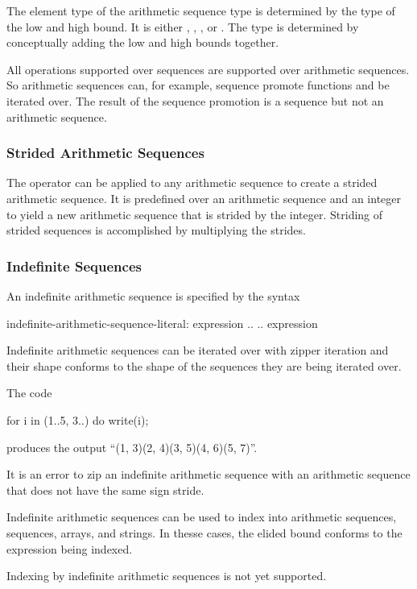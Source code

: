 The element type of the arithmetic sequence type is determined by the
type of the low and high bound.  It is
either , , , or .  The
type is determined by conceptually adding the low and high bounds
together.

All operations supported over sequences are supported over arithmetic
sequences.  So arithmetic sequences can, for example, sequence promote
functions and be iterated over.  The result of the sequence promotion
is a sequence but not an arithmetic sequence.

\subsubsection{Strided Arithmetic Sequences}
\label{Strided_Arithmetic_Sequences}

The  operator can be applied to any arithmetic sequence to
create a strided arithmetic sequence.  It is predefined over an
arithmetic sequence and an integer to yield a new arithmetic sequence
that is strided by the integer.  Striding of strided sequences is
accomplished by multiplying the strides.

\subsubsection{Indefinite Sequences}
\label{Indefinite_Sequences}

An indefinite arithmetic sequence is specified by the syntax
\begin{syntax}
indefinite-arithmetic-sequence-literal:
  expression ..
  .. expression
\end{syntax}

Indefinite arithmetic sequences can be iterated over with zipper
iteration and their shape conforms to the shape of the sequences they
are being iterated over.
\begin{example}
The code
\begin{chapel}
for i in (1..5, 3..) do
  write(i);
\end{chapel}
produces the output ``(1, 3)(2, 4)(3, 5)(4, 6)(5, 7)''.
\end{example}

It is an error to zip an indefinite arithmetic sequence with an
arithmetic sequence that does not have the same sign stride.

Indefinite arithmetic sequences can be used to index into arithmetic
sequences, sequences, arrays, and strings.  In thesse cases, the
elided bound conforms to the expression being indexed.
\begin{implementation}
Indexing by indefinite arithmetic sequences is not yet supported.
\end{implementation}

